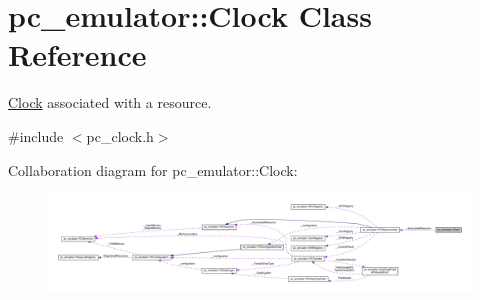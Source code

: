 \hypertarget{classpc__emulator_1_1Clock}{}\section{pc\+\_\+emulator\+:\+:Clock Class Reference}
\label{classpc__emulator_1_1Clock}


\hyperlink{classpc__emulator_1_1Clock}{Clock} associated with a resource.  




{\ttfamily \#include $<$pc\+\_\+clock.\+h$>$}



Collaboration diagram for pc\+\_\+emulator\+:\+:Clock\+:\nopagebreak
\begin{figure}[H]
\begin{center}
\leavevmode
\includegraphics[width=350pt]{classpc__emulator_1_1Clock__coll__graph}
\end{center}
\end{figure}
